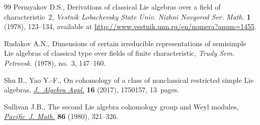 \documentclass[10pt,a4paper]{amsart}
\numberwithin{equation}{section}
\begin{document}
\begin{thebibliography}{99}
Permyakov D.S., Derivations of classical {L}ie algebras over a field of
 characteristic~$2$, \textit{Vestnik Lobachevsky State Univ. Nizhni Novgorod
 Ser. Math.} \textbf{1} (1978), 123--134, available at
 \url{http://www.vestnik.unn.ru/en/nomera?anum=1455}.

Rudakov A.N., Dimensions of certain irreducible representations of semisimple
 {L}ie algebras of classical type over fields of finite characteristic,
 \textit{Trudy Sem. Petrovsk.} (1978), no.~3, 147--160.

Shu B., Yao Y.-F., On cohomology of a class of nonclassical restricted simple
 {L}ie algebras, \href{https://doi.org/10.1142/S0219498817501572}{\textit{J.~Algebra Appl.}} \textbf{16} (2017), 1750157,
 13~pages.

Sullivan J.B., The second {L}ie algebra cohomology group and {W}eyl modules,
 \href{https://doi.org/10.2140/pjm.1980.86.321}{\textit{Pacific~J. Math.}} \textbf{86} (1980), 321--326.

\end{thebibliography}
\end{document}
